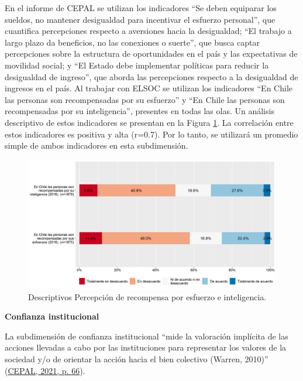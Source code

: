 \documentclass[
  12pt,
]{book}
\begin{document}
En el informe de CEPAL se utilizan los indicadores ``Se deben equiparar los sueldos, no mantener desigualdad para incentivar el esfuerzo personal'', que cuantifica percepciones respecto a aversiones hacia la desigualdad; ``El trabajo a largo plazo da beneficios, no las conexiones o suerte'', que busca captar percepciones sobre la estructura de oportunidades en el país y las expectativas de movilidad social; y ``El Estado debe implementar políticas para reducir la desigualdad de ingreso'', que aborda las percepciones respecto a la desigualdad de ingresos en el país. Al trabajar con ELSOC se utilizan los indicadores ``En Chile las personas son recompensadas por su esfuerzo'' y ``En Chile las personas son recompensadas por su inteligencia'', presentes en todas las olas. Un análisis descriptivo de estos indicadores se presentan en la Figura \ref{fig:justicia}. La correlación entre estos indicadores es positiva y alta (r=0.7). Por lo tanto, se utilizará un promedio simple de ambos indicadores en esta subdimensión.

\begin{figure}[H]

{\centering \includegraphics[width=1\linewidth,height=1\textheight]{output/graphs/justicia} 

}

\caption{Descriptivos Percepción de recompensa por esfuerzo e inteligencia.}\label{fig:justicia}
\end{figure}

\textbf{Confianza institucional}

La subdimensión de confianza institucional ``mide la valoración implícita de las acciones llevadas a cabo por las instituciones para representar los valores de la sociedad y/o de orientar la acción hacia el bien colectivo (Warren, 2010)'' (\protect\hyperlink{ref-cepal_Cohesion_2021}{CEPAL, 2021, p. 66}).
\end{document}
